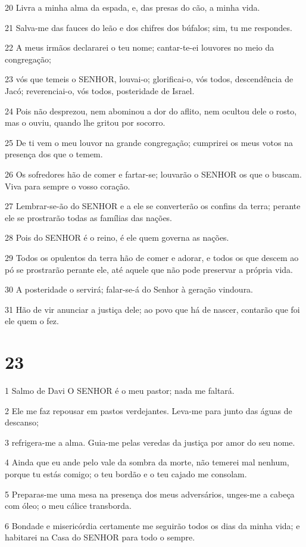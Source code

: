 \par 20 Livra a minha alma da espada, e, das presas do cão, a minha vida.
\par 21 Salva-me das fauces do leão e dos chifres dos búfalos; sim, tu me respondes.
\par 22 A meus irmãos declararei o teu nome; cantar-te-ei louvores no meio da congregação;
\par 23 vós que temeis o SENHOR, louvai-o; glorificai-o, vós todos, descendência de Jacó; reverenciai-o, vós todos, posteridade de Israel.
\par 24 Pois não desprezou, nem abominou a dor do aflito, nem ocultou dele o rosto, mas o ouviu, quando lhe gritou por socorro.
\par 25 De ti vem o meu louvor na grande congregação; cumprirei os meus votos na presença dos que o temem.
\par 26 Os sofredores hão de comer e fartar-se; louvarão o SENHOR os que o buscam. Viva para sempre o vosso coração.
\par 27 Lembrar-se-ão do SENHOR e a ele se converterão os confins da terra; perante ele se prostrarão todas as famílias das nações.
\par 28 Pois do SENHOR é o reino, é ele quem governa as nações.
\par 29 Todos os opulentos da terra hão de comer e adorar, e todos os que descem ao pó se prostrarão perante ele, até aquele que não pode preservar a própria vida.
\par 30 A posteridade o servirá; falar-se-á do Senhor à geração vindoura.
\par 31 Hão de vir anunciar a justiça dele; ao povo que há de nascer, contarão que foi ele quem o fez.

\chapter{23}

\par 1 Salmo de Davi O SENHOR é o meu pastor; nada me faltará.
\par 2 Ele me faz repousar em pastos verdejantes. Leva-me para junto das águas de descanso;
\par 3 refrigera-me a alma. Guia-me pelas veredas da justiça por amor do seu nome.
\par 4 Ainda que eu ande pelo vale da sombra da morte, não temerei mal nenhum, porque tu estás comigo; o teu bordão e o teu cajado me consolam.
\par 5 Preparas-me uma mesa na presença dos meus adversários, unges-me a cabeça com óleo; o meu cálice transborda.
\par 6 Bondade e misericórdia certamente me seguirão todos os dias da minha vida; e habitarei na Casa do SENHOR para todo o sempre.

